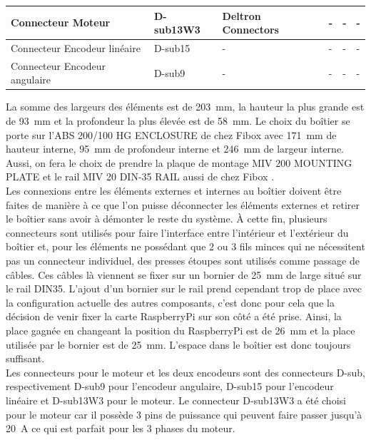 \begin{table}[H]
{\begin{tabular}{|l|l|l|l|l|l|}
            Connecteur Moteur             & D-sub13W3           & Deltron Connectors \cite{Deltron} & -                & -                & -                   \\ \hline
            Connecteur Encodeur linéaire  & D-sub15             & -                                 & -                & -                & -                   \\ \hline
            Connecteur Encodeur angulaire & D-sub9              & -                                 & -                & -                & -                   \\ \hline
        \end{tabular}%
    }
\end{table}

La somme des largeurs des éléments est de 203~mm, la hauteur la plus grande est de 93~mm et la profondeur la plus élevée est de 58~mm. Le choix
du boîtier se porte sur l'ABS 200/100 HG ENCLOSURE de chez Fibox \cite{Fibox} avec 171~mm de hauteur interne, 95~mm de profondeur interne et
246~mm de largeur interne. Aussi, on fera le choix de prendre la plaque de montage MIV 200 MOUNTING PLATE et le rail MIV 20 DIN-35 RAIL aussi
de chez Fibox \cite{Fibox}.\\

Les connexions entre les éléments externes et internes au boîtier doivent être faites de manière à ce que l'on puisse déconnecter les éléments
externes et retirer le boîtier sans avoir à démonter le reste du système. À cette fin, plusieurs connecteurs sont utilisés pour faire l'interface
entre l'intérieur et l'extérieur du boîtier et, pour les éléments ne possédant que 2 ou 3 fils minces qui ne nécessitent pas un connecteur
individuel, des presses étoupes sont utilisés comme passage de câbles. Ces câbles là viennent se fixer sur un bornier de 25~mm de large situé
sur le rail DIN35. L'ajout d'un bornier sur le rail prend cependant trop de place avec la configuration actuelle des autres composants, c'est
donc pour cela que la décision de venir fixer la carte RaspberryPi sur son côté a été prise. Ainsi, la place gagnée en changeant la position du
RaspberryPi est de 26~mm et la place utilisée par le bornier est de 25~mm. L'espace dans le boîtier est donc toujours suffisant.\\

Les connecteurs pour le moteur et les deux encodeurs sont des connecteurs D-sub, respectivement D-sub9 pour l'encodeur angulaire, D-sub15 pour
l'encodeur linéaire et D-sub13W3 pour le moteur. Le connecteur D-sub13W3 a été choisi pour le moteur car il possède 3 pins de puissance qui
peuvent faire passer jusqu'à 20~A ce qui est parfait pour les 3 phases du moteur.

